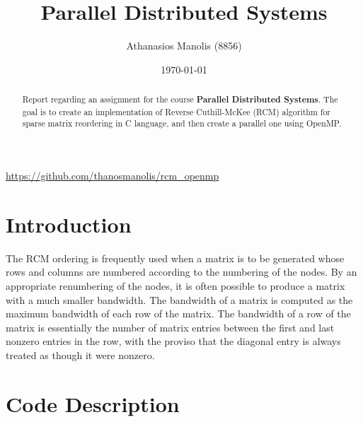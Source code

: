 \documentclass[letterpaper,12pt]{article}
\begin{document}
\title{Parallel Distributed Systems}
\author{Athanasios Manolis (8856)}
\date{\today}
\maketitle

\begin{center}
	\begin{center}
		\href{https://github.com/thanosmanolis/rcm_openmp}{\color{black}\raisebox{-0.2\height}{\fontsize{20}{20} \faGithub}}
	\end{center}
	\vspace{2mm} %
	\url{https://github.com/thanosmanolis/rcm_openmp}
\end{center}

\thispagestyle{empty}
\clearpage
\setcounter{page}{1}

\begin{abstract}
Report regarding an assignment for the course \textbf{Parallel Distributed Systems}. The goal is to create an implementation of Reverse Cuthill-McKee (RCM) algorithm for sparse matrix reordering in C language, and then create a parallel one using OpenMP. 
\end{abstract}

\section{Introduction} 
\vspace{2mm} %

The RCM ordering is frequently used when a matrix is to be generated whose rows and columns are numbered according to the numbering of the nodes. By an appropriate renumbering of the nodes, it is often possible to produce a matrix with a much smaller bandwidth.
\newline\newline
The bandwidth of a matrix is computed as the maximum bandwidth of each row of the matrix. The bandwidth of a row of the matrix is essentially the number of matrix entries between the first and last nonzero entries in the row, with the proviso that the diagonal entry is always treated as though it were nonzero. 

\section{Code Description}
\vspace{2mm} %
\end{document}
